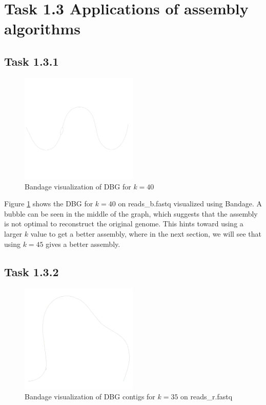 \documentclass[12pt]{article}
\begin{document}
\section{Task 1.3 Applications of assembly algorithms}

\subsection{Task 1.3.1}

\begin{figure}[h!]
    \centering
    \includegraphics[width=0.5\textwidth]{../toy_dataset/reads_b_k_40.png}
    \caption{Bandage visualization of DBG for $k=40$}
    \label{fig:dbg_k_40}
\end{figure} 

Figure \ref{fig:dbg_k_40} shows the DBG for $k=40$ on reads\_b.fastq visualized using Bandage. A bubble can be seen in the middle of the graph, which suggests that the assembly is not optimal to reconstruct the original genome.
This hints toward using a larger $k$ value to get a better assembly, where in the next section, we will see that using $k=45$ gives a better assembly.

\subsection{Task 1.3.2}

\begin{figure}[h!]
    \centering
    \includegraphics[width=0.5\textwidth]{../toy_dataset/r-k-35.png}
    \caption{Bandage visualization of DBG contigs for $k=35$ on reads\_r.fastq}
    \label{fig:dbg_k_35}
\end{figure} 
\end{document}
